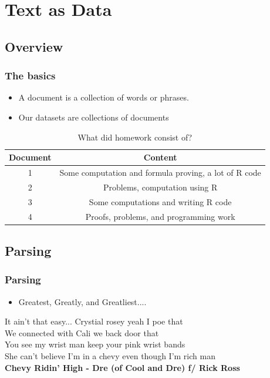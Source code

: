 \documentclass[presentation]{beamer}
\begin{document}
\section{Text as Data }
\subsection{Overview}
\begin{frame}
 \frametitle{The basics}
 \begin{itemize}
\pause
\item A document is a collection of words or phrases.
\pause
\item Our datasets are collections of documents
\end{itemize}
\pause
\begin{table}[!hbpt]
\caption{What did homework consist of? } \label{tab:title}
\pause
\begin{center}
\begin{tabular} {c c}
\textbf{Document} & \textbf{Content} \\
\hline
1 & Some computation and formula proving, a lot of R code \\
2 & Problems, computation using R \\
3 & Some computations and writing R code\\
4 & Proofs, problems, and programming work \\
\end{tabular}
\end{center}
\end{table}
\end{frame}

\subsection{Parsing}

\begin{frame}
\frametitle{Parsing}
\pause
\begin{itemize}
\item Greatest, Greatly, and Greatliest.... 
\pause
\end{itemize}
\begin{block}{It ain't that easy...}
\pause
Crystial rosey yeah I poe that \\
We connected with Cali we back door that \\
\pause
You see my wrist man keep your pink wrist bands \\ 
She can't believe I'm in a chevy even though I'm rich man \\
\pause
\textbf{Chevy Ridin' High - Dre (of Cool and Dre) f/ Rick Ross}
\end{block}
\end{frame}
\end{document}
